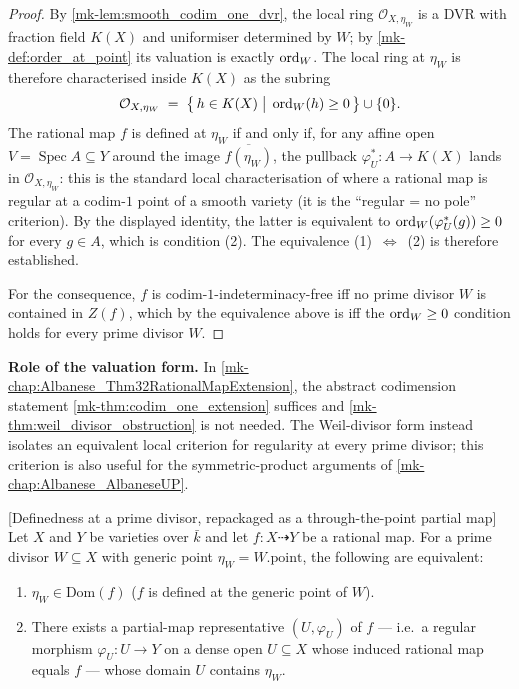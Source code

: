\begin{proof}

  By \ref{mk-lem:smooth_codim_one_dvr}, the local ring \(\mathcal O_{X, \eta_W}\) is a
  DVR with fraction field \(K(X)\) and uniformiser determined by \(W\); by
  \ref{mk-def:order_at_point} its valuation is exactly \(\operatorname{ord}_W\). The local ring at
  \(\eta_W\) is therefore characterised inside \(K(X)\) as the subring
  \[
    \mathcal O_{X, \eta_W} \;=\; \bigl\{\, h \in K(X) \;\big|\; \operatorname{ord}_W(h) \geq 0
    \,\bigr\} \cup \{0\}.
  \]
  The rational map \(f\) is defined at \(\eta_W\) if and only if, for any affine open
  \(V = \operatorname{Spec} A \subseteq Y\) around the image \(\overline{f(\eta_W)}\),
  the pullback \(\varphi_U^\ast \colon A \to K(X)\) lands in
  \(\mathcal O_{X, \eta_W}\): this is the standard local characterisation of where a
  rational map is regular at a codim-\(1\) point of a smooth variety (it is the
  ``regular = no pole'' criterion). By the displayed identity, the latter is
  equivalent to \(\operatorname{ord}_W(\varphi_U^\ast(g)) \geq 0\) for every \(g \in A\), which is
  condition (2). The equivalence (1)~\(\Leftrightarrow\)~(2) is therefore established.

  For the consequence, \(f\) is codim-\(1\)-indeterminacy-free iff no prime divisor \(W\) is
  contained in \(Z(f)\), which by the equivalence above is iff the \(\operatorname{ord}_W \geq 0\)
  condition holds for every prime divisor \(W\).
\end{proof}

\begin{remark}
  \label{mk-rmk:weil_obstruction_application}
  \textbf{Role of the valuation form.} In
  \ref{mk-chap:Albanese_Thm32RationalMapExtension}, the abstract codimension statement
  \ref{mk-thm:codim_one_extension} suffices and \ref{mk-thm:weil_divisor_obstruction}
  is not needed. The Weil-divisor form instead isolates an equivalent local
  criterion for regularity at every prime divisor; this criterion is also useful
  for the symmetric-product arguments of \ref{mk-chap:Albanese_AlbaneseUP}.
\end{remark}

\begin{lemma}


  [Definedness at a prime divisor, repackaged as a through-the-point partial map]
  \label{mk-lem:mem_domain_partial_map_reshuffle}
  Let \(X\) and \(Y\) be varieties over \(\bar k\) and let
  \(f \colon X \dashrightarrow Y\) be a rational map. For a prime divisor
  \(W \subseteq X\) with generic point \(\eta_W = W.\mathrm{point}\), the
  following are equivalent:
  \begin{enumerate}
    \item \(\eta_W \in \mathrm{Dom}(f)\) (\(f\) is defined at the generic point of
      \(W\)).
    \item There exists a partial-map representative \((U, \varphi_U)\) of \(f\) ---
      i.e.\ a regular morphism \(\varphi_U \colon U \to Y\) on a dense open
      \(U \subseteq X\) whose induced rational map equals \(f\) --- whose domain
      \(U\) contains \(\eta_W\).
  \end{enumerate}
\end{lemma}

